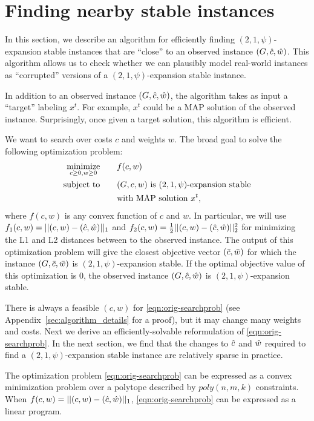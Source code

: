 \section{Finding nearby stable instances}\label{sec:algorithm}
In this section, we describe an algorithm for efficiently finding $(2,1,\psi)$-expansion stable instances that are ``close'' to an observed instance $(G,\hat{c},\hat{w})$. This algorithm allows us to check whether we can plausibly model real-world instances as ``corrupted'' versions of a $(2,1,\psi)$-expansion stable instance.

In addition to an observed instance $(G,\hat{c},\hat{w})$, the algorithm takes as input a ``target'' labeling $x^t$. For example, $x^t$ could be a MAP solution of the observed instance. Surprisingly, once given a target solution, this algorithm is efficient.

We want to search over costs $c$ and weights $w$. 
The broad goal to solve the following optimization problem:
\begin{align}
\label{eqn:orig-searchprob}
\mathop{\mathrm{minimize}{}}_{c\ge 0,w\ge 0} \qquad & f(c,w)\\
\text{subject to} \qquad & (G,c,w) \text{ is } (2,1,\psi)\text{-expansion stable}\nonumber\\
\qquad & \text{with MAP solution } x^t\nonumber,
\end{align}
where $f(c,w)$ is any convex function of $c$ and $w$. 
In particular, we will use $f_1(c,w) = ||(c,w)-(\hat{c},\hat{w})||_1$
and $f_2(c,w) = \frac{1}{2}||(c,w) - (\hat{c},\hat{w})||_2^2$ for minimizing the L1 and L2 distances between to the observed instance.
The output of this optimization problem will give the closest objective vector $(\bar{c},\bar{w})$ for which the instance $(G,\bar{c},\bar{w})$ is $(2,1,\psi)$-expansion stable.
If the optimal objective value of this optimization is 0, the observed instance $(G,\hat{c},\hat{w})$ is $(2,1,\psi)$-expansion stable.

There is always a feasible $(c,w)$ for \eqref{eqn:orig-searchprob} (see Appendix~\ref{sec:algorithm_details} for a proof), but it may change many weights and costs. Next we derive an efficiently-solvable reformulation of \eqref{eqn:orig-searchprob}.
In the next section, we find that the changes to $\hat{c}$ and $\hat{w}$ required to find a $(2,1,\psi)$-expansion stable instance are relatively sparse in practice.
\begin{theorem}
\label{thm:eff-solvable}
The optimization problem \eqref{eqn:orig-searchprob} can be expressed as a convex minimization problem over a polytope described by $poly(n,m,k)$ constraints. When $f(c,w) = ||(c,w)-(\hat{c},\hat{w})||_1$, \eqref{eqn:orig-searchprob} can be expressed as a linear program.
\end{theorem}

